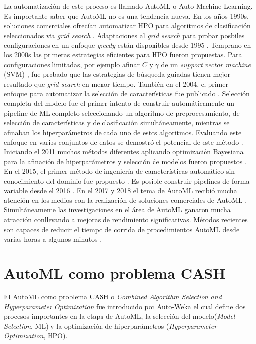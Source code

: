 La automatización de este proceso es llamado AutoML o Auto Machine Learning. Es importante saber que AutoML no es una tendencia nueva. En los años 1990s, soluciones comerciales ofrecían automatizar HPO para algoritmos de clasificación seleccionados vía \textit{grid search} \parencite{17}. Adaptaciones al \textit{grid search} para probar posbiles configuraciones en un enfoque \textit{greedy} están disponibles desde 1995 \parencite{18}. Temprano en los 2000s las primeras estrategias eficientes para HPO fueron propuestas. Para configuraciones limitadas, por ejemplo afinar $C$ y $\gamma$ de un \textit{support vector machine} (SVM) \parencite{19} \parencite{20}, fue probado que las estrategias de búsqueda guiadas tienen mejor resultado que \textit {grid search} en menor tiempo. También en el 2004, el primer enfoque para automatizar la selección de características fue publicado \parencite{21}. Selección completa del modelo \parencite{22} fue el primer intento de construir automáticamente un pipeline de ML completo seleccionando un algoritmo de preprocesamiento, de selección de características y de clasificación simultáneamente, mientras se afinaban los hiperparámetros de cada uno de estos algoritmos. Evaluando este enfoque en varios conjuntos de datos se demostró el potencial de este método \parencite{23}. Iniciando el 2011 muchos métodos diferentes aplicando optimización Bayesiana para la afinación de hiperparámetros \parencite{24} \parencite{25} y selección de modelos fueron propuestos \parencite{13}. En el 2015, el primer método de ingeniería de características automático sin conocimiento del dominio fue propuesto \parencite{26}. Es posible construir pipelines de forma variable desde el 2016 \parencite{27}. En el 2017 y 2018 el tema de AutoML recibió mucha atención en los medios con la realización de soluciones comerciales de AutoML \parencite{28} \parencite{29} \parencite{30} \parencite{31}. Simultáneamente las investigaciones en el área de AutoML ganaron mucha atracción conllevando a mejoras de rendimiento significativas. Métodos recientes son capaces de reducir el tiempo de corrida de procedimientos AutoML desde varias horas a algunos minutos \parencite{32}.

\section{AutoML como problema CASH}

El AutoML como problema CASH o \textit{Combined Algorithm Selection and Hyperparameter Optimization} fue introducido por Auto-Weka el cual define dos procesos importantes en la etapa de AutoML, la selección del modelo(\textit{Model Selection}, ML) y la optimización de hiperparámetros (\textit{Hyperparameter Optimization}, HPO).

